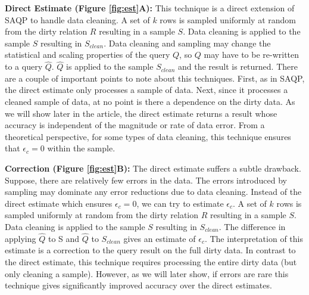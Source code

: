 \vspace{0.5em}
\noindent\textbf{Direct Estimate (Figure \ref{fig:est}A): } This technique is a direct extension of SAQP to handle data cleaning. A set of $k$ rows is sampled uniformly at random from the dirty relation $R$ resulting in a sample $S$. Data cleaning is applied to the sample $S$ resulting in $S_{clean}$.
Data cleaning and sampling may change the statistical and scaling properties of the query $Q$, so $Q$ may have to be re-written to a query $\widehat{Q}$. $\widehat{Q}$ is applied to the sample $S_{clean}$ and the result is returned. 
There are a couple of important points to note about this techniques.
First, as in SAQP, the direct estimate only processes a sample of data.
Next, since it processes a cleaned sample of data, at no point is there a dependence on the dirty data.
As we will show later in the article, the direct estimate returns a result whose accuracy is independent of the magnitude or rate of data error. 
From a theoretical perspective, for some types of data cleaning, this technique ensures that $\epsilon_c = 0$ within the sample.

\vspace{0.5em}
\noindent\textbf{Correction (Figure \ref{fig:est}B): } The direct estimate suffers a subtle drawback. Suppose, there are relatively few errors in the data. The errors introduced by sampling may dominate any error reductions due to data cleaning. Instead of the direct estimate which ensures $\epsilon_c = 0$, we can try to estimate $\epsilon_c$. A set of $k$ rows is sampled uniformly at random from the dirty relation $R$ resulting in a sample $S$. Data cleaning is applied to the sample $S$ resulting in $S_{clean}$. 
The difference in applying $\widehat{Q}$ to S and $\widehat{Q}$ to $S_{clean}$ gives an estimate of $\epsilon_c$. 
The interpretation of this estimate is a correction to the query result on the full dirty data.
In contrast to the direct estimate, this technique requires processing the entire dirty data (but only cleaning a sample).
However, as we will later show, if errors are rare this technique gives significantly improved accuracy over the direct estimates.

